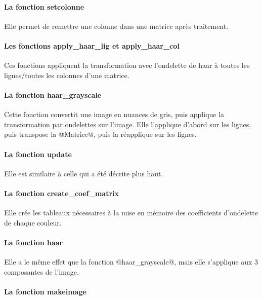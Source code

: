 \documentclass{article}
\begin{document}
\paragraph{La fonction setcolonne}

Elle permet de remettre une colonne dans une matrice après traitement.

\paragraph{Les fonctions apply\_{}haar\_{}lig et apply\_{}haar\_{}col}

Ces fonctions appliquent la transformation avec l'ondelette de haar à toutes les lignes/toutes les colonnes d'une matrice.

\paragraph{La fonction haar\_{}grayscale}

Cette fonction convertit une image en nuances de gris, puis applique la transformation par ondelettes sur l'image. Elle l'applique d'abord sur les lignes, puis transpose la @Matrice@, puis la réapplique sur les lignes.

\paragraph{La fonction update}

Elle est similaire à celle qui a été décrite plus haut.

\paragraph{La fonction create\_{}coef\_{}matrix}

Elle crée les tableaux nécessaires à la mise en mémoire des coefficients d'ondelette de chaque couleur.

\paragraph{La fonction haar}

Elle a le même effet que la fonction @haar\_{}grayscale@, mais elle s'applique aux 3 composantes de l'image.

\paragraph{La fonction makeimage}
\end{document}
